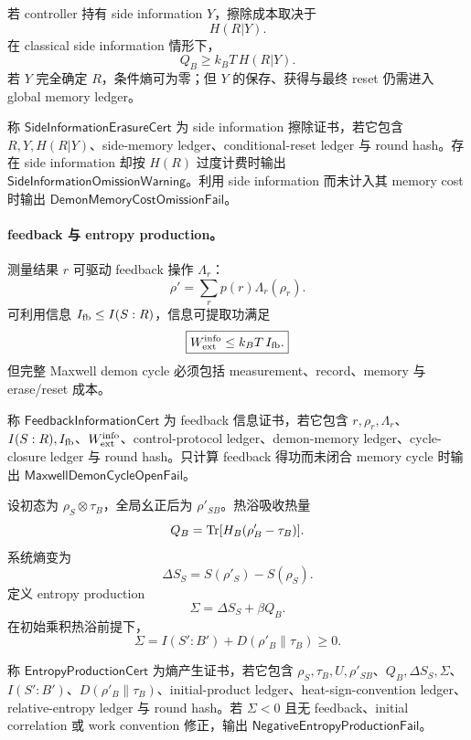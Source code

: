 若 controller 持有 side information \(Y\)，擦除成本取决于
\[
\boxed{
H(R|Y).
}
\]
在 classical side information 情形下，
\[
Q_B\ge k_BT\,H(R|Y).
\]
若 \(Y\) 完全确定 \(R\)，条件熵可为零；但 \(Y\) 的保存、获得与最终 reset 仍需进入 global memory ledger。

\begin{definition}\label{def:typed-address-biaxial-completion-side-information-erasure-cert}
称 \(\mathsf{SideInformationErasureCert}\) 为 side information 擦除证书，若它包含 \(R,Y,H(R|Y)\)、side-memory ledger、conditional-reset ledger 与 round hash。存在 side information 却按 \(H(R)\) 过度计费时输出 \(\mathsf{SideInformationOmissionWarning}\)。利用 side information 而未计入其 memory cost 时输出 \(\mathsf{DemonMemoryCostOmissionFail}\)。
\end{definition}

\paragraph{feedback 与 entropy production。}
测量结果 \(r\) 可驱动 feedback 操作 \(\Lambda_r\)：
\[
\rho'=\sum_rp(r)\Lambda_r(\rho_r).
\]
可利用信息 \(I_{\rm fb}\le I(S:R)\)，信息可提取功满足
\[
\boxed{
W_{\rm ext}^{\rm info}\le k_BT\,I_{\rm fb}.
}
\]
但完整 Maxwell demon cycle 必须包括 measurement、record、memory 与 erase/reset 成本。

\begin{definition}\label{def:typed-address-biaxial-completion-feedback-information-cert}
称 \(\mathsf{FeedbackInformationCert}\) 为 feedback 信息证书，若它包含 \(r,\rho_r,\Lambda_r\)、\(I(S:R),I_{\rm fb}\)、\(W_{\rm ext}^{\rm info}\)、control-protocol ledger、demon-memory ledger、cycle-closure ledger 与 round hash。只计算 feedback 得功而未闭合 memory cycle 时输出 \(\mathsf{MaxwellDemonCycleOpenFail}\)。
\end{definition}

设初态为 \(\rho_S\otimes\tau_B\)，全局幺正后为 \(\rho'_{SB}\)。热浴吸收热量
\[
Q_B={\rm Tr}[H_B(\rho'_B-\tau_B)].
\]
系统熵变为
\[
\Delta S_S=S(\rho'_S)-S(\rho_S).
\]
定义 entropy production
\[
\boxed{
\Sigma=\Delta S_S+\beta Q_B.
}
\]
在初始乘积热浴前提下，
\[
\boxed{
\Sigma=I(S':B')+D(\rho'_B\|\tau_B)\ge0.
}
\]

\begin{definition}[熵产生证书]\label{def:typed-address-biaxial-completion-entropy-production-cert}
称 \(\mathsf{EntropyProductionCert}\) 为熵产生证书，若它包含 \(\rho_S,\tau_B,U,\rho'_{SB}\)、\(Q_B,\Delta S_S,\Sigma\)、\(I(S':B')\)、\(D(\rho'_B\|\tau_B)\)、initial-product ledger、heat-sign-convention ledger、relative-entropy ledger 与 round hash。若 \(\Sigma<0\) 且无 feedback、initial correlation 或 work convention 修正，输出 \(\mathsf{NegativeEntropyProductionFail}\)。
\end{definition}

